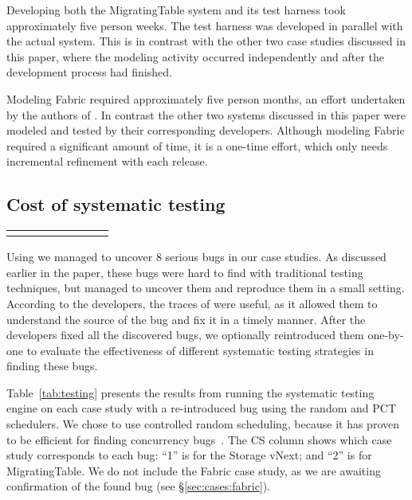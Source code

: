 Developing both the MigratingTable system and its \psharp test harness took approximately five person weeks. The \psharp test harness was developed in parallel with the actual system. This is in contrast with the other two case studies discussed in this paper, where the modeling activity occurred independently and after the development process had finished.

Modeling Fabric required approximately five person months, an effort undertaken by the authors of \psharp. In contrast the other two systems discussed in this paper were modeled and tested by their corresponding developers. Although modeling Fabric required a significant amount of time, it is a one-time effort, which only needs incremental refinement with each release.

\subsection{Cost of systematic testing}
\label{sec:eval:machine_cost}

\setlength{\tabcolsep}{.72em}
\begin{table*}[t]
\small
\centering
\begin{tabular}{rl rrr rrr}
\centering

\end{tabular}
\caption{Results from running the \psharp random and PCT systematic testing schedulers for 100,000 executions. We report: time in seconds to find a bug (Time to Bug); number of scheduling steps when a bug was found (\#SS); and if a bug was found with a particular scheduler (BF?).}
\label{tab:testing}
\end{table*}

Using \psharp we managed to uncover 8 serious bugs in our case studies. As discussed earlier in the paper, these bugs were hard to find with traditional testing techniques, but \psharp managed to uncover them and reproduce them in a small setting. According to the developers, the traces of \psharp were useful, as it allowed them to understand the source of the bug and fix it in a timely manner. After the developers fixed all the discovered bugs, we optionally reintroduced them one-by-one to evaluate the effectiveness of different \psharp systematic testing strategies in finding these bugs.

Table~\ref{tab:testing} presents the results from running the \psharp systematic testing engine on each case study with a re-introduced bug using the random and PCT schedulers. We chose to use controlled random scheduling, because it has proven to be efficient for finding concurrency bugs~\cite{thomson2014sct, deligiannis2015psharp}. The CS column shows which case study corresponds to each bug: ``1'' is for the \Azure Storage vNext; and ``2'' is for MigratingTable. We do not include the Fabric case study, as we are awaiting confirmation of the found bug (see \S\ref{sec:cases:fabric}).

